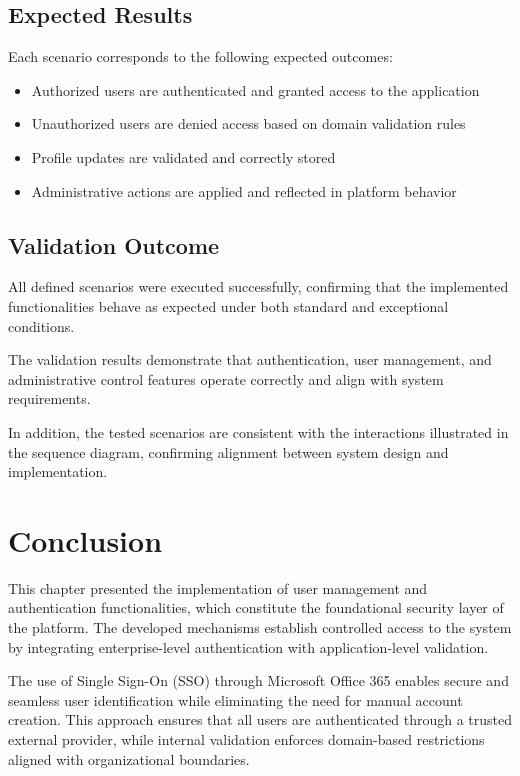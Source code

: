 \subsection{Expected Results}

Each scenario corresponds to the following expected outcomes:

\begin{itemize}
    \item Authorized users are authenticated and granted access to the application
    \item Unauthorized users are denied access based on domain validation rules
    \item Profile updates are validated and correctly stored
    \item Administrative actions are applied and reflected in platform behavior
\end{itemize}

\subsection{Validation Outcome}

All defined scenarios were executed successfully, confirming that the implemented functionalities behave as expected under both standard and exceptional conditions.

The validation results demonstrate that authentication, user management, and administrative control features operate correctly and align with system requirements.

In addition, the tested scenarios are consistent with the interactions illustrated in the sequence diagram, confirming alignment between system design and implementation.

\section{Conclusion}

This chapter presented the implementation of user management and authentication functionalities, which constitute the foundational security layer of the platform. The developed mechanisms establish controlled access to the system by integrating enterprise-level authentication with application-level validation.

The use of Single Sign-On (SSO) through Microsoft Office 365 enables secure and seamless user identification while eliminating the need for manual account creation. This approach ensures that all users are authenticated through a trusted external provider, while internal validation enforces domain-based restrictions aligned with organizational boundaries.


